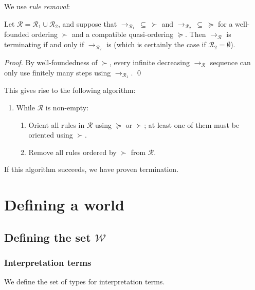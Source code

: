 \documentclass[runningheads,a4paper]{llncs}
\newcommand{\World}{\mathcal{W}}
\newcommand{\Rules}{\mathcal{R}}
\newcommand{\arr}[1]{\to_{#1}}
\begin{document}
\renewcommand{\theenumii}{\alph{enumii}}

We use \emph{rule removal}:

\begin{theorem}
Let $\Rules = \Rules_1 \cup \Rules_2$, and suppose that $\arr{\Rules_1}\:
\subseteq\:\succ$ and $\arr{\Rules_2}\:\subseteq\:\succeq$ for a
well-founded ordering $\succ$ and a compatible quasi-ordering $\succeq$.
Then $\arr{\Rules}$ is terminating if and only if $\arr{\Rules_2}$ is
(which is certainly the case if $\Rules_2 = \emptyset$).
\end{theorem}

\begin{proof}
By well-foundedness of $\succ$, every infinite decreasing $\arr{\Rules}$
sequence can only use finitely many steps using $\arr{\Rules_1}$.
\qed
\end{proof}

This gives rise to the following algorithm:
\begin{enumerate}
\item While $\Rules$ is non-empty:
  \begin{enumerate}
  \item Orient all rules in $\Rules$ using $\succeq$ or $\succ$; at least
    one of them must be oriented using $\succ$.
  \item Remove all rules ordered by $\succ$ from $\Rules$.
  \end{enumerate}
\end{enumerate}
If this algorithm succeeds, we have proven termination.

\section{Defining a world}

\subsection{Defining the set $\World$}

\subsubsection{Interpretation terms}
We define the set of types for interpretation terms.
\end{document}
